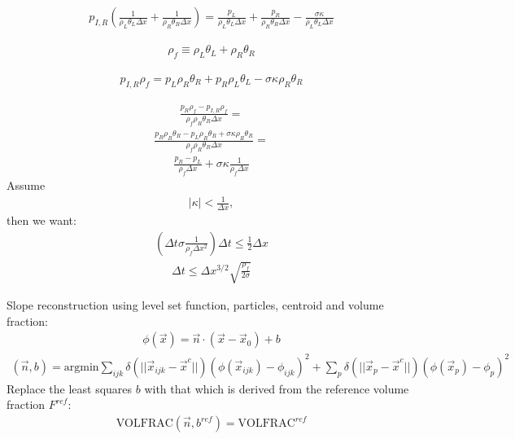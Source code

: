\documentclass[preprint,12pt]{Definitions/elsarticle}
\begin{document}
\begin{enumerate}
\begin{eqnarray*}
p_{I,R}\left( 
\frac{1}{\rho_{L}\theta_{L}\Delta x}+
\frac{1}{\rho_{R}\theta_{R}\Delta x} \right)=
\frac{p_{L}}{\rho_{L}\theta_{L}\Delta x}+
\frac{p_{R}}{\rho_{R}\theta_{R}\Delta x}-
\frac{\sigma\kappa}{\rho_{L}\theta_{L}\Delta x}
\end{eqnarray*}

\begin{eqnarray*}
\rho_{f}\equiv \rho_{L}\theta_{L}+\rho_{R}\theta_{R}
\end{eqnarray*}

\begin{eqnarray*}
p_{I,R}\rho_{f}=
p_{L}\rho_{R}\theta_{R}+
p_{R}\rho_{L}\theta_{L}-\sigma\kappa\rho_{R}\theta_{R}
\end{eqnarray*}

\begin{eqnarray*}
\frac{p_{R}\rho_{f}-p_{I,R}\rho_{f}}{\rho_{f}\rho_{R}\theta_{R}\Delta x}=
\end{eqnarray*}
\begin{eqnarray*}
\frac{p_{R}\rho_{R}\theta_{R}-p_{L}\rho_{R}\theta_{R}+
 \sigma\kappa\rho_{R}\theta_{R}}{\rho_{f}\rho_{R}\theta_{R}\Delta x}=
\end{eqnarray*}
\begin{eqnarray*}
\frac{p_{R}-p_{L}}{\rho_{f}\Delta x}+\sigma\kappa\frac{1}{\rho_{f}\Delta x}
\end{eqnarray*}
Assume
\begin{eqnarray*}
|\kappa|<\frac{1}{\Delta x},
\end{eqnarray*}
then we want:
\begin{eqnarray*}
\left(\Delta t \sigma\frac{1}{\rho_{f}\Delta x^{2}}\right)\Delta t \le 
\frac{1}{2}\Delta x
\end{eqnarray*}
\begin{eqnarray*}
\Delta t \le \Delta x^{3/2} \sqrt{\frac{\rho_{f}}{2\sigma}}
\end{eqnarray*}

\newpage

\par\noindent
Slope reconstruction using level set function, particles, centroid and
volume fraction:
\begin{eqnarray*}
 \phi(\vec{x})=\vec{n}\cdot(\vec{x}-\vec{x}_{0})+b
\end{eqnarray*}
\begin{eqnarray*}
(\vec{n},b)=\mbox{argmin}
 \sum_{ijk}\delta(||\vec{x}_{ijk}-\vec{x}^{c}||)
 (\phi(\vec{x}_{ijk})-\phi_{ijk})^{2}+
 \sum_{p}\delta(||\vec{x}_{p}-\vec{x}^{c}||)
 (\phi(\vec{x}_{p})-\phi_{p})^{2}
\end{eqnarray*}
Replace the least squares $b$ with that which is derived from the 
reference volume fraction $F^{ref}$:
\begin{eqnarray*}
\mbox{VOLFRAC}(\vec{n},b^{ref})=\mbox{VOLFRAC}^{ref}
\end{eqnarray*}


\end{enumerate}
\end{document}
